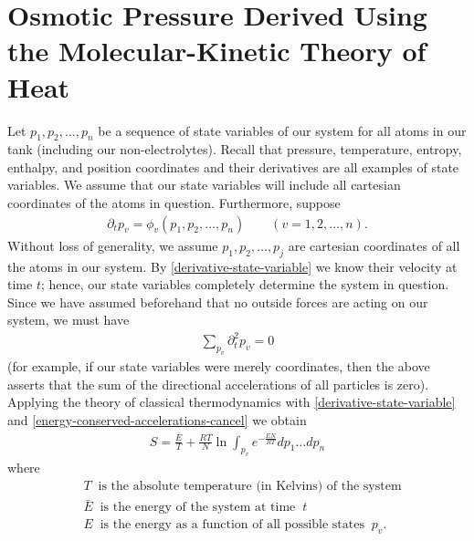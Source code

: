 \documentclass[12pt,reqno]{amsart}
\newcommand{\p}{\partial}
\theoremstyle{plain}  %
\theoremstyle{definition}
\begin{document}
\section{Osmotic Pressure Derived Using the Molecular-Kinetic Theory of Heat}
Let $p_1,p_2,\dots,p_n$ be a sequence of state variables of our system for all atoms
in our tank (including our non-electrolytes). Recall that pressure, temperature,
entropy, enthalpy, and position coordinates and their derivatives are
all examples of state variables. We assume that our state variables will
include all cartesian coordinates of the atoms in question. Furthermore, suppose 
\begin{equation}
  \begin{split}
    \p_t p_v = \phi_v(p_1,p_2,\dots,p_n) \qquad (v=1,2,\dots,n).
    \label{derivative-state-variable}
  \end{split}
\end{equation}
Without loss of generality, we assume $p_1,p_2,\dots,p_j$ are cartesian coordinates of
all the atoms in our system. By \eqref{derivative-state-variable} we know their
velocity at time $t$; hence, our state variables completely determine the system in
question. Since we have assumed beforehand that no outside forces are acting on our system, we must have 
\begin{equation}
  \begin{split}
    \sum_{p_v} \p_t^2 p_v = 0
    \label{energy-conserved-accelerations-cancel}
  \end{split}
\end{equation}
(for example, if our state variables were merely coordinates, then the above asserts
that the sum of the directional accelerations of all particles is zero). Applying the theory
of classical thermodynamics with \eqref{derivative-state-variable} and
\eqref{energy-conserved-accelerations-cancel} we obtain
\begin{equation*}
  \begin{split}
    S = \frac{\bar{E}}{T} + \frac{RT}{N}\ln \int_{p_v} e^{-\frac{EN}{RT}}dp_1\dots dp_n
    \label{entropy-equation}
  \end{split}
\end{equation*}
where 
\begin{equation*}
  \begin{split}
    & T \; \; \text{is the absolute temperature (in Kelvins) of the system}
    \\
    & \bar{E} \; \; \text{is the energy of the system at time} \; \; t
    \\
    & E \; \; \text{is the energy as a function of all possible states}
    \; \; p_v.
    \label{entropy-equation-defs}
  \end{split}
\end{equation*}
\end{document}
